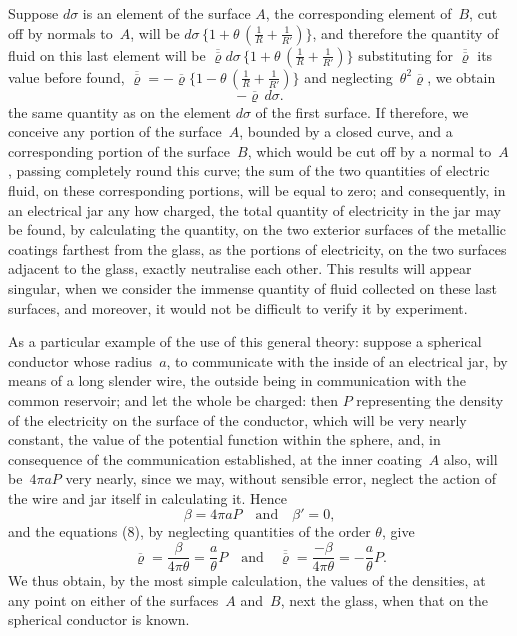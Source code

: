 \documentclass[12pt,notitlepage]{amsart}
\renewcommand{\rho}{\varrho}
\begin{document}
Suppose $d\sigma$ is an element of the surface $A$, the corresponding element
of~$B$, cut off by normals to~$A$, will be
$d\sigma\,\{1+\theta\,(\frac1R+\frac{1}{R'})\}$, and therefore
the quantity of fluid on this last element will be
$\overline{\overline\rho}d\sigma\,\{1+\theta\,(\frac1R+\frac{1}{R'})\}$
substituting for $\overline{\overline\rho}$ its value before found,
$\overline{\overline\rho}=
-\overline\rho\{1-\theta\,(\frac1R+\frac{1}{R'})\}$
and neglecting~$\theta^2\overline\rho$, we obtain
\[
-\overline\rho\,d\sigma.
\]
the same quantity as on the element $d\sigma$
of the first surface. If therefore, we
conceive any portion of the surface~$A$, bounded by a closed curve, and a
corresponding portion of the surface~$B$, which would be cut off by a normal
to~$A$, passing completely round this curve; the sum of the two quantities of
electric fluid, on these corresponding portions, will be equal to zero; and
consequently, in an electrical jar any how charged, the total quantity of
electricity in the jar may be found, by calculating the quantity, on the two
exterior surfaces of the metallic coatings farthest from the glass, as the 
portions of electricity,
on the two surfaces adjacent to the glass, exactly neutralise
each other. This results will appear singular, when we consider the immense
quantity of fluid collected on these last surfaces, and moreover, it would not
be difficult to verify it by experiment.

As a particular example of the use of this general theory: suppose
a spherical conductor whose radius~$a$, to communicate with the inside of an
electrical jar, by means of a long slender wire, the outside being in 
communication with the common reservoir; and let the whole be charged: then $P$
representing the density of the electricity on the surface of the conductor,
which will be very nearly constant, the value of the potential function within
the sphere, and, in consequence of the communication established, at the inner
coating~$A$ also, will be~$4\pi aP$ very nearly, since we may, without sensible
error, neglect the action of the wire and jar itself in calculating it. Hence
\[
\beta=4\pi aP \quad\text{and}\quad \beta'=0,
\]
and the equations (8), by neglecting quantities of the order $\theta$, give
\[
\overline\rho=\frac{\beta}{4\pi\theta}=\frac{a}{\theta}P
\quad\text{and}\quad
\overline{\overline\rho}=\frac{-\beta}{4\pi\theta}=-\frac{a}{\theta}P.
\]
We thus obtain, by the most simple calculation, the values of the densities,
at any point on either of the surfaces~$A$ and~$B$,
next the glass, when that
on the spherical conductor is known.
\end{document}

